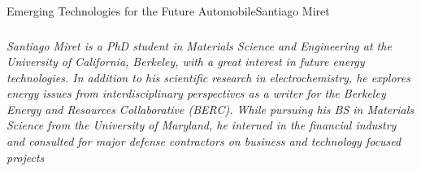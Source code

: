 \documentclass[10pt]{papertex}
\begin{document}
\begin{news}{2}{Emerging Technologies for the Future Automobile}{Santiago Miret}{}{}
\subsubsection*{}

\emph{Santiago Miret is a PhD student in Materials Science and Engineering at
the University of California, Berkeley, with a great interest in future energy
technologies. In addition to his scientific research in electrochemistry, he
explores energy issues from interdisciplinary perspectives as a writer for the
Berkeley Energy and Resources Collaborative (BERC). While pursuing his BS in
Materials Science from the University of Maryland, he interned in the financial
industry and consulted for major defense contractors on business and technology
focused projects}

\end{news}
\end{document}

